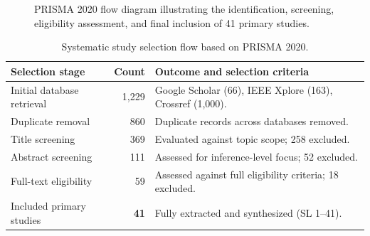 \IfFileExists{jair.cls}{\documentclass{jair}}{\documentclass[manuscript,nonacm,screen]{acmart}}
\begin{document}
\begin{figure}[t]
\caption{PRISMA 2020 flow diagram illustrating the identification, screening, eligibility assessment, and final inclusion of 41 primary studies.}
\label{fig:selection-flow}
\end{figure}

\begin{table}[t]
\caption{Systematic study selection flow based on PRISMA 2020.}
\label{tab:prisma-selection}
\centering
\small
\begin{tabularx}{\linewidth}{l r X}
\toprule
Selection stage & Count & Outcome and selection criteria \\
\midrule
Initial database retrieval & 1,229 & Google Scholar (66), IEEE Xplore (163), Crossref (1,000). \\
Duplicate removal & 860 & Duplicate records across databases removed. \\
Title screening & 369 & Evaluated against topic scope; 258 excluded. \\
Abstract screening & 111 & Assessed for inference-level focus; 52 excluded. \\
Full-text eligibility & 59 & Assessed against full eligibility criteria; 18 excluded. \\
Included primary studies & \textbf{41} & Fully extracted and synthesized (SL 1--41). \\
\bottomrule
\end{tabularx}
\end{table}
\end{document}
